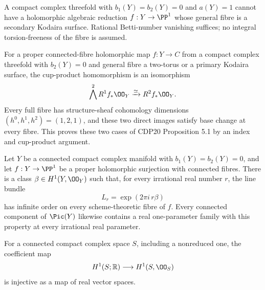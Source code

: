 \begin{proposition}\hypertarget{tag-01FF}{}\label{cdp:st:C.3.9}



A compact complex threefold with $b_1(Y)=b_2(Y)=0$ and
$a(Y)=1$ cannot have a holomorphic algebraic reduction
$f:Y\to\PP^1$ whose general fibre is a secondary Kodaira
surface. Rational Betti-number vanishing suffices; no integral
torsion-freeness of the fibre is assumed.
\end{proposition}

\begin{proposition}\hypertarget{tag-01FX}{}\label{cdp:st:D.1.12}


For a proper connected-fibre holomorphic map $f:Y\to C$ from a
compact complex threefold with $b_2(Y)=0$ and general fibre a
two-torus or a primary Kodaira surface, the cup-product homomorphism
is an isomorphism
\[
\bigwedge^2R^1f_*\OO_Y\xrightarrow{\simeq}R^2f_*\OO_Y.
\]
Every full fibre has structure-sheaf cohomology dimensions
$(h^0,h^1,h^2)=(1,2,1)$, and these two direct images satisfy
base change at every fibre. This proves these two cases of CDP20
Proposition 5.1 by an index and cup-product argument.
\end{proposition}

\begin{proposition}\hypertarget{tag-01G7}{}\label{cdp:st:D.1.9}


Let $Y$ be a connected compact complex manifold with
$b_1(Y)=b_2(Y)=0$, and let $f:Y\to\PP^1$ be a proper
holomorphic surjection with connected fibres. There is a class
$\beta\in H^1(Y,\OO_Y)$ such that, for every irrational real number
$r$, the line bundle
\[
L_r=\exp(2\pi i\,r\beta)
\]
has infinite order on every scheme-theoretic fibre of $f$.
Every connected component of $\Pic(Y)$ likewise contains a real
one-parameter family with this property at every irrational real
parameter.

\end{proposition}

\begin{proposition}\hypertarget{tag-01G5}{}\label{cdp:st:D.1.7}


For a connected compact complex space $S$, including a nonreduced
one, the coefficient map
\[
H^1(S;\mathbb R)\longrightarrow H^1(S,\OO_S)
\]
is injective as a map of real vector spaces.
\end{proposition}

